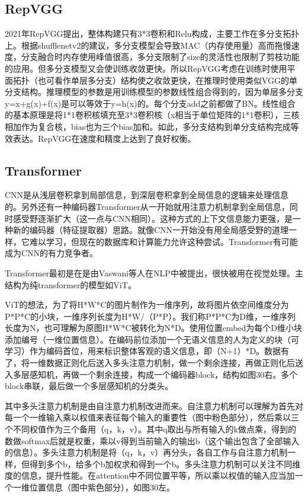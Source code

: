 \documentclass[15pt]{article}
\begin{document}
\subsection{RepVGG}
2021年RepVGG提出，整体构建只有3*3卷积和Relu构成，主要工作在多分支拓扑上。根据shufflenetv2的建议，多分支模型会导致MAC（内存使用量）高而拖慢速度，分支融合时内存使用峰值很高，多分支限制了size的灵活性也限制了剪枝功能的应用。但多分支模型又会使训练收敛更快。所以RepVGG考虑在训练时使用平面拓扑（也可看作单层多分支）结构使之收敛更快，在推理时使用类似VGG的单分支结构。推理模型的参数是用训练模型的参数线性组合得到的，因为单层多分支y=x+g(x)+f(x)是可以等效于y=h(x)的。每个分支add之前都做了BN。线性组合的基本原理是将1*1卷积核填充至3*3卷积核（x相当于单位矩阵的1*1卷积），三核相加作为复合核，bias也为三个bias加和。如此，多分支结构到单分支结构完成等效表达。RepVGG在速度和精度上达到了良好权衡。

\subsection{Transformer}
CNN是从浅层卷积拿到局部信息，到深层卷积拿到全局信息的逻辑来处理信息的。另外还有一种编码器Transformer从一开始就用注意力机制拿到全局信息，同时感受野逐渐扩大（这一点与CNN相同）。这种方式的上下文信息能力更强，是一种新的编码器（特征提取器）思路。就像CNN一开始没有用全局感受野的道理一样，它难以学习，但现在的数据库和计算能力允许这种尝试。Transformer有可能成为CNN的有力竞争者。

Transformer最初是在是由Vaswani等人在NLP中被提出，很快被用在视觉处理。主结构为纯transformer的模型如ViT\cite{ref95}。

ViT的想法，为了将H*W*C的图片制作为一维序列，故将图片依空间维度分为P*P*C的小块，一维序列长度为H*W/（P*P）。我们称P*P*C为D维，一维序列长度为N，也可理解为原图H*W*C被转化为N*D。使用位置embed为每个D维小块添加编号（一维位置信息）。在编码前位添加一个无语义信息的人为定义的块（可学习）作为编码首位，用来标识整体客观的语义信息，即（N+1）*D。数据有了，将一维数据正则化后送入多头注意力机制，做一个剩余连接，再做正则化后送入多层感知机，再做一个剩余连接，构成一个编码器block，结构如图30右。多个block串联，最后做一个多层感知机的分类头。

其中多头注意力机制是由自注意力机制改进而来。自注意力机制可以理解为首先对每一个一维输入乘以权值来表征每个输入的重要性（图中粉色部分），然后乘以三个不同权值作为三个备用（q，k，v）。其中q取出与所有输入的k做点乘，得到的数做softmax后就是权重，乘以v得到当前输入的输出b（这个输出包含了全部输入的信息）。多头注意力机制是将（q，k，v）再分头，各自工作与自注意力机制一样，但得到多个b，给多个b加权求和得到一个b。多头注意力机制可以关注不同维度的信息，提升性能。在attention中不同位置平等，所以乘以权值的输入应当加一个一维位置信息（图中紫色部分），如图30左。
\end{document}

